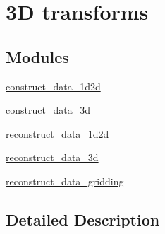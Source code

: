 \hypertarget{group__applications__mri3d}{\section{3\-D transforms}
\label{group__applications__mri3d}
}
\subsection*{Modules}
\begin{DoxyCompactItemize}
\item 
\hyperlink{group__applications__mri3d__construct__data__1d2d}{construct\-\_\-data\-\_\-1d2d}
\item 
\hyperlink{group__applications__mri3d__construct__data__3d}{construct\-\_\-data\-\_\-3d}
\item 
\hyperlink{group__applications__mri3d__reconstruct__data__1d2d}{reconstruct\-\_\-data\-\_\-1d2d}
\item 
\hyperlink{group__applications__mri3d__reconstruct__data__3d}{reconstruct\-\_\-data\-\_\-3d}
\item 
\hyperlink{group__applications__mri3d__reconstruct__data__gridding}{reconstruct\-\_\-data\-\_\-gridding}
\end{DoxyCompactItemize}


\subsection{Detailed Description}
